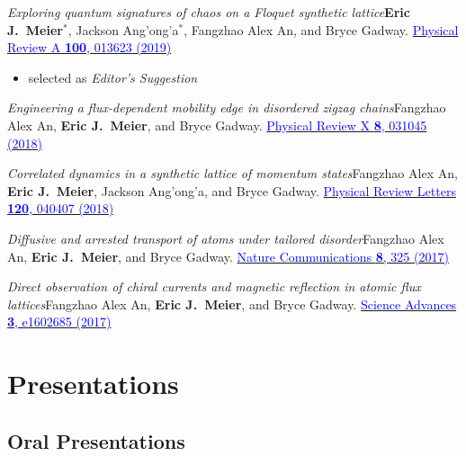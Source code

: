 \documentclass[12pt,letterpaper,sans]{moderncv}
\newcommand*{\paper}[4]{\textit{#1}\newline #2. \newline\href{#3}{\textcolor{blue}{#4}}}
\begin{document}
\begin{etaremune}[topsep=0pt,itemsep=4pt,partopsep=0pt,parsep=0pt]
\item \paper{Exploring quantum signatures of chaos on a Floquet synthetic lattice}{\textbf{Eric J.\ Meier$^*$}, Jackson Ang’ong’a$^*$, Fangzhao Alex An, and Bryce Gadway}{https://journals.aps.org/pra/abstract/10.1103/PhysRevA.100.013623}{Physical Review A \textbf{100}, 013623 (2019)}
\begin{itemize}
\item selected as \emph{Editor's Suggestion}
\end{itemize}

\item \paper{Engineering a flux-dependent mobility edge in disordered zigzag chains}{Fangzhao Alex An, \textbf{Eric J.\ Meier}, and Bryce Gadway}{https://journals.aps.org/prx/abstract/10.1103/PhysRevX.8.031045}{Physical Review X \textbf{8}, 031045 (2018)}

\item \paper{Correlated dynamics in a synthetic lattice of momentum states}{Fangzhao Alex An, \textbf{Eric J.\ Meier}, Jackson Ang'ong'a, and Bryce Gadway}{https://link.aps.org/doi/10.1103/PhysRevLett.120.040407}{Physical Review Letters \textbf{120}, 040407 (2018)}

\item \paper{Diffusive and arrested transport of atoms under tailored disorder}{Fangzhao Alex An, \textbf{Eric J.\ Meier}, and Bryce Gadway}{https://www.nature.com/articles/s41467-017-00387-w}{Nature Communications \textbf{8}, 325 (2017)}

\item \paper{Direct observation of chiral currents and magnetic reflection in atomic flux lattices}{Fangzhao Alex An, \textbf{Eric J.\ Meier}, and Bryce Gadway}{http://advances.sciencemag.org/content/3/4/e1602685}{Science Advances \textbf{3}, e1602685 (2017)}

\end{etaremune}


\section{Presentations}

\subsection{Oral Presentations}
\end{document}
